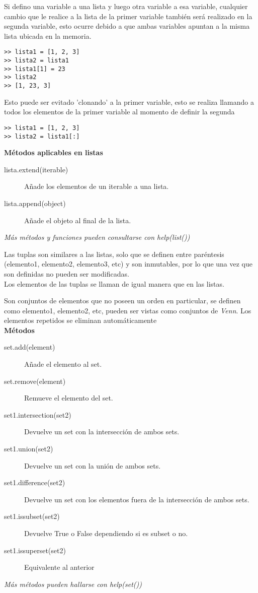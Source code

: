 \documentclass[10pt,a4paper]{article}
\begin{document}
\begin{description}[
align=right,
labelindent = 1cm,
labelsep=0.5cm,
itemindent=0cm]
Si defino una variable a una lista y luego otra variable a esa variable, cualquier cambio que le realice a la lista de la primer variable también será realizado en la segunda variable, esto ocurre debido a que ambas variables apuntan a la misma lista ubicada en la memoria.\\
\begin{lstlisting}
>> lista1 = [1, 2, 3]
>> lista2 = lista1
>> lista1[1] = 23
>> lista2
>> [1, 23, 3]\end{lstlisting}
Esto puede ser evitado 'clonando' a la primer variable, esto se realiza llamando a todos los elementos de la primer variable al momento de definir la segunda\\
\begin{lstlisting}
>> lista1 = [1, 2, 3]
>> lista2 = lista1[:]\end{lstlisting}
\textbf{Métodos aplicables en listas}
\begin{description}
\item [lista.extend(iterable)] Añade los elementos de un iterable a una lista.
\item [lista.append(object)] Añade el objeto al final de la lista.
\end{description}
\textit{Más métodos y funciones pueden consultarse con \emph{help(list())}}

\item [tuple]
Las tuplas son similares a las listas, solo que se definen entre paréntesis (elemento1, elemento2, elemento3, etc) y son inmutables, por lo que una vez que son definidas no pueden ser modificadas.\\ Los elementos de las tuplas se llaman de igual manera que en las listas.

\item [set]
Son conjuntos de elementos que no poseen un orden en particular, se definen como {elemento1, elemento2, etc}, pueden ser vistas como conjuntos de \emph{Venn}. Los elementos repetidos se eliminan automáticamente\\

\textbf{Métodos}
\begin{description}
\item [set.add(element)] Añade el elemento al set.
\item [set.remove(element)] Remueve el elemento del set.
\item [set1.intersection(set2)] Devuelve un set con la intersección de ambos sets.
\item [set1.union(set2)] Devuelve un set con la unión de ambos sets.
\item [set1.difference(set2)] Devuelve un set con los elementos fuera de la intersección de ambos sets.
\item [set1.issubset(set2)] Devuelve True o False dependiendo si es subset o no.
\item [set1.issuperset(set2)] Equivalente al anterior
\end{description}
\textit{Más métodos pueden hallarse con \emph{help(set())}}


\end{description}
\end{document}

